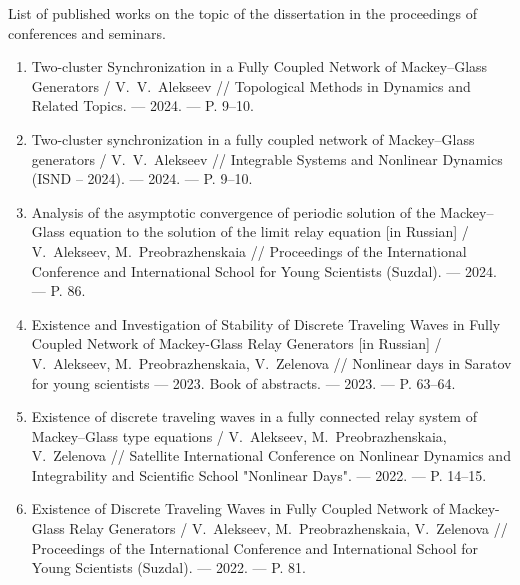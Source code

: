 \medskip

List of published works on the topic of the dissertation in the proceedings of conferences and seminars.
\begin{enumerate}
	\item Two-cluster Synchronization in a Fully Coupled Network of	Mackey--Glass Generators / V.~V.~Alekseev // Topological Methods in Dynamics and Related Topics. --- 2024. --- P. 9--10. \cite{confbib6}
	\item Two-cluster synchronization in a fully coupled network of	Mackey--Glass generators / V.~V.~Alekseev // Integrable Systems and Nonlinear Dynamics (ISND -- 2024). --- 2024. --- P. 9--10. \cite{confbib5}
	\item Analysis of the asymptotic convergence of periodic solution of the Mackey–Glass equation to the solution of the limit relay equation [in Russian]	/ V.~Alekseev, M.~Preobrazhenskaia // Proceedings of the International Conference and International School for Young Scientists (Suzdal). --- 2024. --- P. 86. \cite{confbib3}
	\item Existence and Investigation of Stability of Discrete Traveling Waves in Fully Coupled Network of Mackey-Glass Relay Generators [in Russian] / V.~Alekseev, M.~Preobrazhenskaia, V.~Zelenova // Nonlinear days in Saratov for young scientists — 2023. Book of abstracts. --- 2023. --- P. 63--64. \cite{confbib2}
	\item Existence of discrete traveling waves in a fully connected relay system of Mackey–Glass type equations / V.~Alekseev, M.~Preobrazhenskaia, V.~Zelenova // Satellite International Conference on Nonlinear Dynamics and Integrability and Scientific School "Nonlinear Days". --- 2022. --- P. 14--15. \cite{confbib4}
	\item Existence of Discrete Traveling Waves in Fully Coupled Network of Mackey-Glass Relay Generators / V.~Alekseev, M.~Preobrazhenskaia, V.~Zelenova // Proceedings of the International Conference and International School for Young Scientists (Suzdal). --- 2022. --- P. 81. \cite{confbib1}
\end{enumerate}

\begin{refsection}
    \nocite{vakbib2}%
    \nocite{patbib1}%
    \nocite{progbib1}%
    \nocite{bib1}%
    \nocite{confbib1}%
\end{refsection}%


